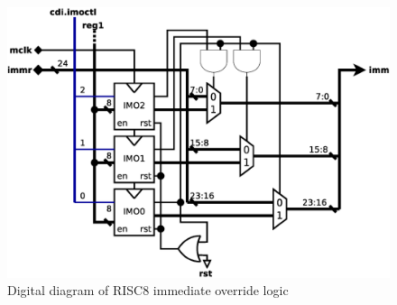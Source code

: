 \documentclass[a4paper,12pt]{article}
\begin{document}
\begin{figure}[h!]
	\centering
	\includegraphics[scale=0.35]{graphics/imo.eps}
	\caption{Digital diagram of RISC8 immediate override logic}
	\label{fig:imo}
\end{figure}
\end{document}
